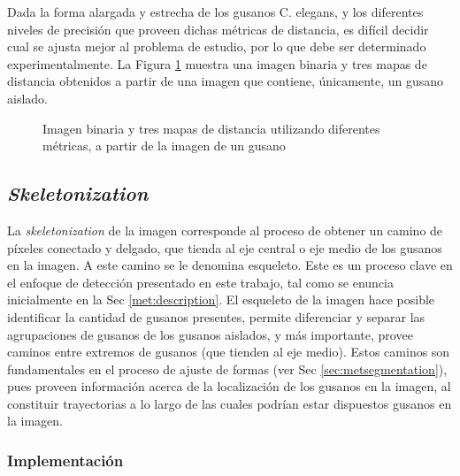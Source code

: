 Dada la forma alargada y estrecha de los gusanos C. elegans, y los diferentes niveles
de precisi\'on que proveen dichas m\'etricas de distancia, es dif\'icil decidir
cual se ajusta mejor al problema de estudio, por lo que debe ser determinado
experimentalmente. La Figura \ref{fig:distance} muestra una imagen binaria y tres
mapas de distancia obtenidos a partir de una imagen que contiene, \'unicamente, un
gusano aislado.

\begin{figure}[h t b p ! H]
  \centering
\qquad
\qquad                
\qquad
  \caption{ Imagen binaria y tres mapas de distancia utilizando diferentes m\'etricas,
    a partir de la imagen de un gusano}
  \label{fig:distance}
\end{figure}

\subsection{\emph{Skeletonization}}
\label{sec:metsk}

La \emph{skeletonization} de la imagen corresponde al proceso de obtener un 
camino de p\'ixeles conectado y delgado, que tienda
al eje central o eje medio de los gusanos en la imagen. A este camino se le
denomina esqueleto. Este es un proceso
clave en el enfoque de detecci\'on presentado en este trabajo, tal como
se enuncia inicialmente en la Sec \ref{met:description}. El esqueleto de la
imagen hace posible identificar la cantidad de gusanos presentes, permite
diferenciar y separar las agrupaciones de gusanos de los gusanos aislados, 
y m\'as importante, provee caminos entre extremos de gusanos (que tienden
al eje medio). Estos caminos son fundamentales en el proceso de ajuste
de formas (ver Sec \ref{sec:metsegmentation}), pues proveen informaci\'on
acerca de la localizaci\'on de los gusanos en la imagen, al constituir trayectorias
a lo largo de las cuales podr\'ian estar dispuestos gusanos en la imagen.

\subsubsection*{Implementaci\'on}
\label{sec:skeletonimp}


